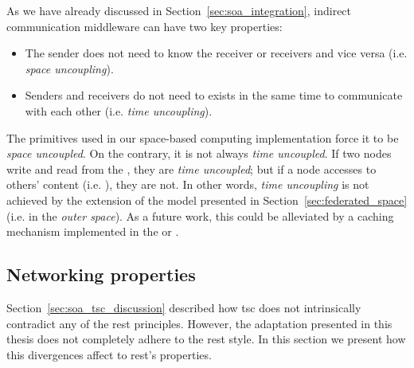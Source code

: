 As we have already discussed in Section~\ref{sec:soa_integration}, indirect communication middleware can have two key properties:
\begin{itemize}
  \item The sender does not need to know the receiver or receivers and vice versa (i.e. \emph{space uncoupling}).
  \item Senders and receivers do not need to exists in the same time to communicate with each other (i.e. \emph{time uncoupling}).
\end{itemize}


The primitives used in our space-based computing implementation force it to be \emph{space uncoupled}.
On the contrary, it is not always \emph{time uncoupled}.
If two nodes write and read from the \coordspace{}, they are \emph{time uncoupled};
but if a node accesses to others' content (i.e. \selfgraphs{}), they are not.
In other words, \emph{time uncoupling} is not achieved by the extension of the model presented in Section~\ref{sec:federated_space} (i.e. in the \emph{outer space}).
As a future work, this could be alleviated by a caching mechanism implemented in the \coordinator{} or \coordinators{}. %




\subsection{Networking properties} %
\label{sec:network_properties}

Section~\ref{sec:soa_tsc_discussion} described how \ac{tsc} does not intrinsically contradict any of the \ac{rest} principles.
However, the adaptation presented in this thesis does not completely adhere to the \ac{rest} style.
In this section we present how this divergences affect to \ac{rest}'s properties.


